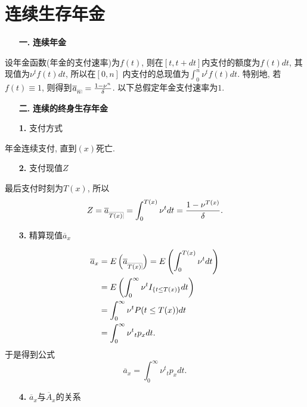 \documentclass[a4paper,openany, 10pt]{ctexbook}
\makeatletter
\newcommand{\hei}{\CJKfamily{hei}}      %
\def\z{\left}
\def\y{\right}
\DeclareRobustCommand{\annu}[1]{_{%
    \def\arraystretch{0}%
    \setlength\arraycolsep{1pt}%
    \setlength\arrayrulewidth{.2pt}%
    \begin{array}[b]{@{}c|}\hline
        \\[\arraycolsep]%
        \scriptstyle #1%
    \end{array}%
}}
\makeatother
\begin{document}
\section{连续生存年金}
\begin{itemize}
    \item[{\bf\hei 一.}]{\bf\hei 连续年金}
\end{itemize}

设年金函数(年金的支付速率)为$f(t)$, 则在$[t,t+dt]$内支付的额度为$f(t)dt$, 其现值为$\nu^tf(t)dt$, 所以在$[0,n]$ 内支付的总现值为$\int_0^n \nu^tf(t)dt$. 特别地, 若$f(t) \equiv 1$, 则得到$\overline{a}_{\annu n} = \frac{1-\nu^n}{\delta}$.
以下总假定年金支付速率为$1.$

\begin{itemize}
    \item[{\bf\hei 二.}]{\bf\hei 连续的终身生存年金}
\end{itemize}

\begin{itemize}
    \item[{\bf\hei 1.}] 支付方式
\end{itemize}

年金连续支付, 直到$(x)$死亡.

\begin{itemize}
    \item[{\bf\hei 2.}] 支付现值$Z$
\end{itemize}

最后支付时刻为$T(x)$, 所以$$Z = \overline{a}_{\annu{T(x)}} = \int_0^{T(x)} \nu^tdt = \frac{1-\nu^{T(x)}}{\delta}.$$

\begin{itemize}
    \item[{\bf\hei 3.}] 精算现值$\overline{a}_x$
\end{itemize}
\begin{align*}
    \overline{a}_x & = E\z(\overline{a}_{\annu{T(x)}}\y) = E\z(\int_0^{T(x)} \nu^tdt\y) \\
                   & = E\z(\int_0^{\infty} \nu^tI_{\{t \leq T(x)\}}dt\y)            \\
                   & = \int_0^{\infty} \nu^tP(t \leq T(x))dt                    \\
                   & = \int_0^{\infty} \nu^t{}_{t}p_xdt.
\end{align*}
于是得到公式$$\overline{a}_x=\int_0^{\infty} \nu^t{}_{t}p_xdt.$$
\begin{itemize}
    \item[{\bf\hei 4.}] $\overline{a}_x$与$\overline{A}_x$的关系
\end{itemize}
\end{document}
